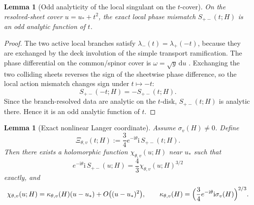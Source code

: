\documentclass[11pt]{article}
\numberwithin{equation}{section}
\newtheorem{lemma}[theorem]{Lemma}
\theoremstyle{definition}
\newcommand{\ii}{\mathrm i}
\newcommand{\dd}{\mathrm d}
\begin{document}
\begin{lemma}[Odd analyticity of the local singulant on the $t$-cover]
\label{lem:odd-singulant}
On the resolved-sheet cover $u=u_*+t^2$, the exact local phase mismatch $S_{+-}(t;H)$ is an odd analytic function of $t$.
\end{lemma}

\begin{proof}
The two active local branches satisfy $\lambda_-(t)=\lambda_+(-t)$, because they are exchanged by the deck involution of the simple transport ramification. The phase differential on the common/spinor cover is $\omega=\sqrt{y}\,\dd u$ \cite{Primer,Strategy}. Exchanging the two colliding sheets reverses the sign of the sheetwise phase difference, so the local action mismatch changes sign under $t\mapsto -t$:
\[
S_{+-}(-t;H)=-S_{+-}(t;H).
\]
Since the branch-resolved data are analytic on the $t$-disk, $S_{+-}(t;H)$ is analytic there. Hence it is an odd analytic function of $t$.
\end{proof}

\begin{lemma}[Exact nonlinear Langer coordinate]
\label{lem:nonlinear-Langer}
Assume $\sigma_v(H)\neq 0$. Define
\begin{equation}
\label{eq:Xi-def}
 \Xi_{\theta,v}(t;H):=\frac{3}{4}e^{-\ii\theta}\ii\,S_{+-}(t;H).
\end{equation}
Then there exists a holomorphic function $\chi_{\theta,v}(u;H)$ near $u_*$ such that
\begin{equation}
\label{eq:exact-Airy-rectification}
 e^{-\ii\theta}\ii\,S_{+-}(u;H)=\frac{4}{3}\chi_{\theta,v}(u;H)^{3/2}
\end{equation}
exactly, and
\begin{equation}
\label{eq:chi-linear}
 \chi_{\theta,v}(u;H)=\kappa_{\theta,v}(H)(u-u_*)+O\bigl((u-u_*)^2\bigr),
 \qquad
 \kappa_{\theta,v}(H)=\Bigl(\frac{3}{4}e^{-\ii\theta}\ii\sigma_v(H)\Bigr)^{2/3}.
\end{equation}
\end{lemma}
\end{document}

